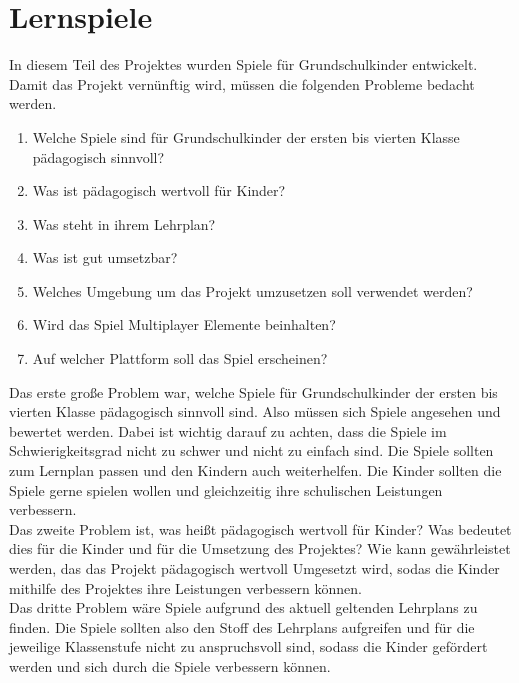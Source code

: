 \section{Lernspiele}

In diesem Teil des Projektes wurden Spiele für Grundschulkinder entwickelt. Damit das Projekt vernünftig wird, müssen die folgenden Probleme bedacht werden.
\begin{enumerate}
    \item Welche Spiele sind für Grundschulkinder der ersten bis vierten Klasse pädagogisch sinnvoll?
    \item Was ist pädagogisch wertvoll für Kinder?
    \item Was steht in ihrem Lehrplan?
    \item Was ist gut umsetzbar?
    \item Welches Umgebung um das Projekt umzusetzen soll verwendet werden?
    \item Wird das Spiel Multiplayer Elemente beinhalten?
    \item Auf welcher Plattform soll das Spiel erscheinen?
\end{enumerate}


Das erste große Problem war, welche Spiele für Grundschulkinder der ersten bis vierten Klasse pädagogisch sinnvoll sind. Also müssen sich Spiele angesehen und bewertet werden. Dabei ist wichtig darauf zu achten, dass die Spiele im Schwierigkeitsgrad nicht zu schwer und nicht zu einfach sind. Die Spiele sollten zum Lernplan passen und den Kindern auch weiterhelfen. Die Kinder sollten die Spiele gerne spielen wollen und gleichzeitig ihre schulischen Leistungen verbessern.
\\

Das zweite Problem ist, was heißt pädagogisch wertvoll für Kinder? Was bedeutet dies für die Kinder und für die Umsetzung des Projektes? Wie kann gewährleistet werden, das das Projekt pädagogisch wertvoll Umgesetzt wird, sodas die Kinder mithilfe des Projektes ihre Leistungen verbessern können.
\\

Das dritte Problem wäre Spiele aufgrund des aktuell geltenden Lehrplans zu finden. Die Spiele sollten also den Stoff des Lehrplans aufgreifen und für die jeweilige Klassenstufe nicht zu anspruchsvoll sind, sodass die Kinder gefördert werden und sich durch die Spiele verbessern können.
\\

